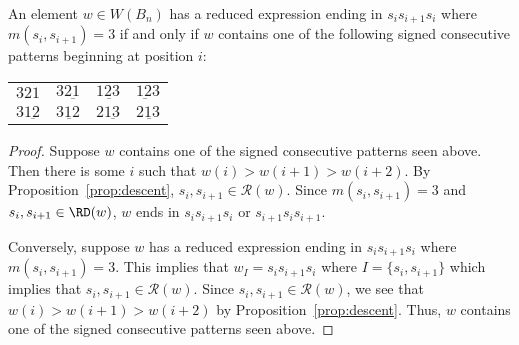 \begin{proposition}\label{lem:sts}
An element $w \in W(B_n)$ has a reduced expression ending in $s_is_{i+1}s_i$ where $m(s_i,s_{i+1})=3$ if and only if $w$ contains one of the following signed consecutive patterns beginning at position $i$:
%
\begin{center}
\begin{tabular}{llll}
$321$             & $32\underbar{1}$ & $1 \underbar{23}$ & $\underbar{123}$  \\
$31 \underbar{2}$ & $3 \underbar{12}$ & $21\underbar{3}$  & $2 \underbar{13}$ 

\end{tabular}	
\end{center}
%
\begin{proof}
	Suppose $w$ contains one of the signed consecutive patterns seen above. Then there is some $i$ such that $w(i) > w(i+1) > w(i+2)$. By Proposition~\ref{prop:descent}, $s_i,s_{i+1} \in \mathcal{R}(w)$. Since $m(s_i,s_{i+1})=3$ and $s_i, s_{i+1} \in \RD(w)$, $w$ ends in $s_is_{i+1}s_{i}$ or $s_{i+1}s_is_{i+1}$.
	
	Conversely, suppose $w$ has a reduced expression ending in $s_is_{i+1}s_i$ where $m(s_i,s_{i+1})=3$. This implies that $w_I=s_is_{i+1}s_i$ where $I=\{s_i, s_{i+1}\}$ which implies that $s_i,s_{i+1} \in \mathcal{R}(w)$. Since $s_i,s_{i+1} \in \mathcal{R}(w)$, we see that $w(i)>w(i+1)>w(i+2)$ by Proposition~\ref{prop:descent}. Thus, $w$ contains one of the signed consecutive patterns seen above.
\end{proof}	
\end{proposition}

%
%
%

